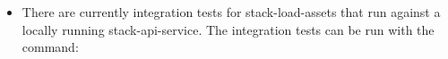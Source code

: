 \begin{Shaded}
\begin{Highlighting}[]
\end{Highlighting}
\end{Shaded}

\begin{itemize}
\tightlist
\item
  There are currently integration tests for stack-load-assets that run
  against a locally running stack-api-service. The integration tests can
  be run with the command:
\end{itemize}

\begin{Shaded}
\begin{Highlighting}[]
\end{Highlighting}
\end{Shaded}

